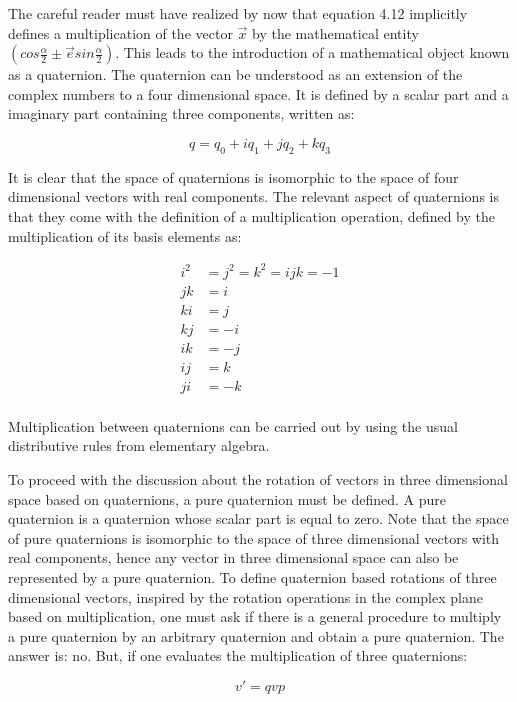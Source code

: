 	The careful reader must have realized by now that equation 4.12 implicitly defines a multiplication of the vector $\vec{x}$ by the mathematical entity $(cos \frac{\alpha }{2} \pm \vec{e} sin \frac{\alpha }{2})$. This leads to the introduction of a mathematical object known as a quaternion. The quaternion can be understood as an extension of the complex numbers to a four dimensional space. It is defined by a scalar part and a imaginary part containing three components, written as: 

\begin{equation}
	q = q_0 + iq_1 + jq_2 + kq_3
\end{equation}

\indent
	It is clear that the space of quaternions is isomorphic to the space of four dimensional vectors with real components. The relevant aspect of quaternions is that they come with the definition of a multiplication operation, defined by the multiplication of its basis elements as: 

\begin{align}
	i^2 &= j^2 = k^2 = ijk = -1 \\
	jk &= i \\
	ki & = j \\
	kj & = -i \\
	ik &= -j \\
	ij &= k \\
	ji &= -k\\
\end{align}

\indent
	Multiplication between quaternions can be carried out by using the usual distributive rules from elementary algebra. 

\indent
	To proceed with the discussion about the rotation of vectors in three dimensional space based on quaternions, a pure quaternion must be defined. A pure quaternion is a quaternion whose scalar part is equal to zero. Note that the space of pure quaternions is isomorphic to the space of three dimensional vectors with real components, hence any vector in three dimensional space can also be represented by a pure quaternion. To define quaternion based rotations of three dimensional vectors, inspired by the rotation operations in the complex plane based on multiplication, one must ask if there is a general procedure to multiply a pure quaternion by an arbitrary quaternion and obtain a pure quaternion. The answer is: no. But, if one evaluates the multiplication of three quaternions: 

\begin{equation}
	v' = qvp
\end{equation}

